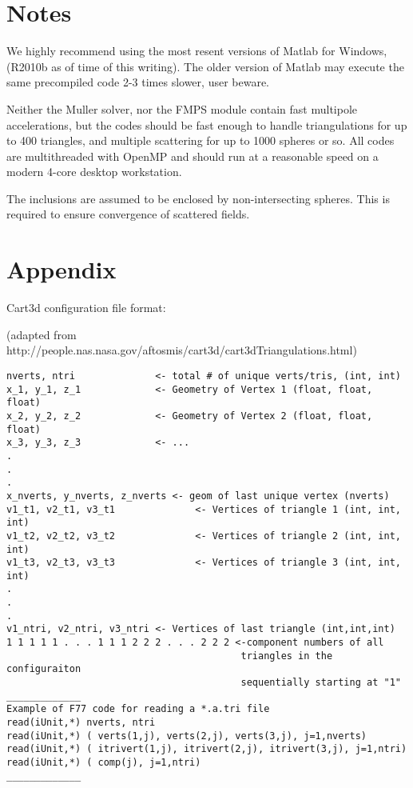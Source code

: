 \documentclass{article}
\begin{document}
\section{Notes}

We highly recommend using the most resent versions of Matlab for
Windows, (R2010b as of time of this writing). The older version of
Matlab may execute the same precompiled code 2-3 times slower, user
beware.

Neither the Muller solver, nor the FMPS module contain fast multipole
accelerations, but the codes should be fast enough to handle
triangulations for up to 400 triangles, and multiple scattering for up
to 1000 spheres or so.  All codes are multithreaded with OpenMP and
should run at a reasonable speed on a modern 4-core desktop
workstation.

The inclusions are assumed to be enclosed by non-intersecting
spheres. This is required to ensure convergence of scattered fields.



\section{Appendix}

Cart3d configuration file format:

(adapted from
http://people.nas.nasa.gov/aftosmis/cart3d/cart3dTriangulations.html)

\begin{verbatim}
nverts, ntri              <- total # of unique verts/tris, (int, int)
x_1, y_1, z_1             <- Geometry of Vertex 1 (float, float, float)
x_2, y_2, z_2             <- Geometry of Vertex 2 (float, float, float)
x_3, y_3, z_3             <- ...
.
.
.
x_nverts, y_nverts, z_nverts <- geom of last unique vertex (nverts)
v1_t1, v2_t1, v3_t1              <- Vertices of triangle 1 (int, int, int)
v1_t2, v2_t2, v3_t2              <- Vertices of triangle 2 (int, int, int)
v1_t3, v2_t3, v3_t3              <- Vertices of triangle 3 (int, int, int)
.
.
.
v1_ntri, v2_ntri, v3_ntri <- Vertices of last triangle (int,int,int)
1 1 1 1 1 . . . 1 1 1 2 2 2 . . . 2 2 2 <-component numbers of all
                                         triangles in the configuraiton
                                         sequentially starting at "1"
_____________
Example of F77 code for reading a *.a.tri file
read(iUnit,*) nverts, ntri
read(iUnit,*) ( verts(1,j), verts(2,j), verts(3,j), j=1,nverts)
read(iUnit,*) ( itrivert(1,j), itrivert(2,j), itrivert(3,j), j=1,ntri)
read(iUnit,*) ( comp(j), j=1,ntri)
_____________
\end{verbatim}
\end{document}
